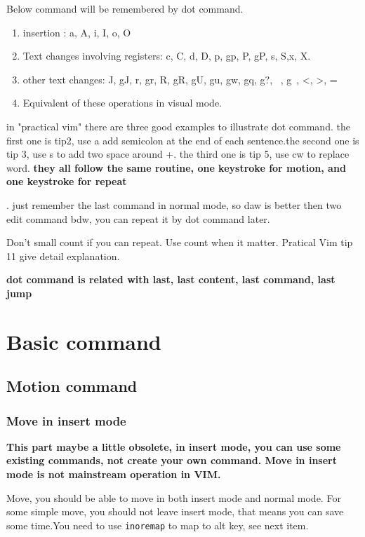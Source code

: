 \documentclass[paper=8.5in:11in, twoside, 12pt, pagesize=pdftex]{book}
\begin{document}
Below command will be remembered by dot command.
\begin{enumerate}
	\item insertion : a, A, i, I, o, O
	
	\item Text changes involving registers: c, C, d, D, p, gp, P, gP, s, S,x, X.
	
	\item other text changes: J, gJ, r, gr, R, gR, gU, gu, gw, gq, g?, ~, g~, <, >, =
	
	\item Equivalent of these operations in visual mode.
	
\end{enumerate}

in "practical vim" there are three good examples to illustrate dot command. the first one is tip2, use a add semicolon at the end of each sentence.the second one is tip 3, use s to add two space around +. the third one is tip 5, use cw to replace word. \textbf{they all follow the same routine, one keystroke for motion, and one keystroke for repeat}

. just remember the last command in normal mode, so daw is better then two edit command bdw, you can repeat it by dot command later.

Don't small count if you can repeat. Use count when it matter. Pratical Vim tip 11 give detail explanation. 	

\textbf{dot command is related with last, last content, last command, last jump}

	
\section{Basic command}
\subsection{Motion command}
\subsubsection{Move in insert mode}
	
	\textbf{This part maybe a little obsolete, in insert mode, you can use some existing commands, not create your own command. Move in insert mode is not mainstream operation in VIM.}
	
	Move, you should be able to move in both insert mode and normal mode. For some simple move, you should not leave insert mode, that means you can save some time.You need to use \verb!inoremap! to map to alt key, see next item.  
	
\end{document}
